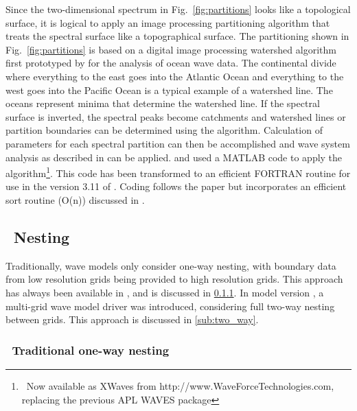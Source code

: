 Since the two-dimensional spectrum in Fig.~\ref{fig:partitions} looks like a
topological surface, it is logical to apply an image processing partitioning
algorithm that treats the spectral surface like a topographical surface.  The
partitioning shown in Fig.~\ref{fig:partitions} is based on a digital image
processing watershed algorithm \citep{art:VS91} first prototyped by
\cite{pro:HJ04} for the analysis of ocean wave data. The continental divide
where everything to the east goes into the Atlantic Ocean and everything to
the west goes into the Pacific Ocean is a typical example of a watershed line.
The oceans represent minima that determine the watershed line.  If the
spectral surface is inverted, the spectral peaks become catchments and
watershed lines or partition boundaries can be determined using the
\cite{art:VS91} algorithm.  Calculation of parameters for each spectral
partition can then be accomplished and wave system analysis as described in
\cite{art:HP01} can be applied.  \cite{pro:HJ04} and \cite{tol:Vict06b} used a
MATLAB code to apply the \cite{art:VS91} algorithm\footnote{~Now available as
XWaves from http://www.WaveForceTechnologies.com, replacing the previous APL
WAVES package}.  This code has been transformed to an efficient FORTRAN
routine for use in the version 3.11 of \ws.  Coding follows the
\cite{art:VS91} paper but incorporates an efficient sort routine (O(n))
discussed in \cite{rep:TTH06}.


\vssub
\subsection{~Nesting}
\vssub

Traditionally, wave models only consider one-way nesting, with boundary data
from low resolution grids being provided to high resolution grids. This
approach has always been available in \ws, and is discussed in
\para\ref{sub:one_way}. In model version \WWver, a multi-grid wave model
driver was introduced, considering full two-way nesting between grids. This
approach is discussed in \para\ref{sub:two_way}.


\vssub
\subsubsection{~Traditional one-way nesting} \label{sub:one_way}
\vssub

